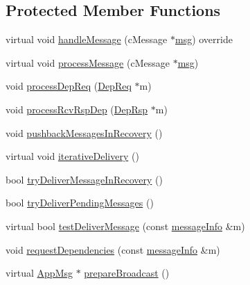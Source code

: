 \subsection*{Protected Member Functions}
\begin{DoxyCompactItemize}
\item 
virtual void \hyperlink{class_node_with_recovery_a901c89606b84898e13fe8a66228acd9f}{handle\+Message} (c\+Message $\ast$\hyperlink{_controller_8h_afa0f3b802fbc219228f7bb97996fa558}{msg}) override
\item 
virtual void \hyperlink{class_node_with_recovery_a216c29d76ddb0e94cd5701ff208c7f5b}{process\+Message} (c\+Message $\ast$\hyperlink{_controller_8h_afa0f3b802fbc219228f7bb97996fa558}{msg})
\item 
void \hyperlink{class_node_with_recovery_a52ef51093d41e9b337987810311a7bc6}{process\+Dep\+Req} (\hyperlink{class_dep_req}{Dep\+Req} $\ast$m)
\item 
void \hyperlink{class_node_with_recovery_a34b5b66f90d85dd84b237b8cf81f2f7e}{process\+Rcv\+Rsp\+Dep} (\hyperlink{class_dep_rsp}{Dep\+Rsp} $\ast$m)
\item 
void \hyperlink{class_node_with_recovery_a261e41c94a93113168f8f81411b7c100}{pushback\+Messages\+In\+Recovery} ()
\item 
virtual void \hyperlink{class_node_with_recovery_a9b61912f38b62452584dc80bf261ef4e}{iterative\+Delivery} ()
\item 
bool \hyperlink{class_node_with_recovery_a87a1ce8071c9c587b878636f79163e7e}{try\+Deliver\+Message\+In\+Recovery} ()
\item 
bool \hyperlink{class_node_with_recovery_a462d825601a3c85ee4ef95be673790f8}{try\+Deliver\+Pending\+Messages} ()
\item 
virtual bool \hyperlink{class_node_with_recovery_aec147b3723b3dab00f9610453ba8daba}{test\+Deliver\+Message} (const \hyperlink{structures_8h_a7e7bdc1d2fff8a9436f2f352b2711ed6}{message\+Info} \&m)
\item 
void \hyperlink{class_node_with_recovery_a8b16bbc948fddc744a55ac548348a988}{request\+Dependencies} (const \hyperlink{structures_8h_a7e7bdc1d2fff8a9436f2f352b2711ed6}{message\+Info} \&m)
\item 
virtual \hyperlink{class_app_msg}{App\+Msg} $\ast$ \hyperlink{class_node_with_recovery_a33d8e8775fd69cb647b38a54b36e1ebe}{prepare\+Broadcast} ()
\end{DoxyCompactItemize}
